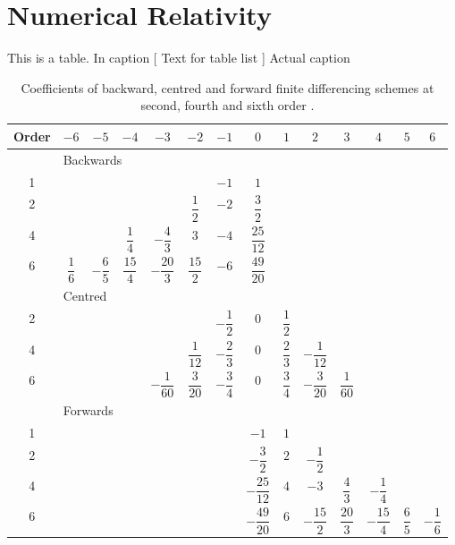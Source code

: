 \chapter{Numerical Relativity} \label{sec: NR}

This is a table. In caption [ Text for table list ] { Actual caption }

\begin{table}[!ht]
\centering
\begin{tabular}{c|ccccccccccccc}
Order & $-6$ & $-5$ & $-4$ & $-3$ & $-2$ & $-1$ & $0$ & $1$ & $2$ & $3$ & $4$ & $5$ & $6$ \\
\hline
      & \multicolumn{3}{l}{Backwards} & & & & & & & & & & \\
\hline
\rule{0pt}{4ex}1     & & & & &  & $- 1$ & $1$ & & & & & & \\[2.25ex]
2     & & & & & $\dfrac{1}{2}$ & $- 2$ & $\dfrac{3}{2}$ & & & & & & \\[2.25ex]
4     & & & $\dfrac{1}{4}$ & $- \dfrac{4}{3}$ & $3$ & $- 4$ & $\dfrac{25}{12}$ & & & & & & \\[2.25ex]
6     & $\dfrac{1}{6}$ & $- \dfrac{6}{5}$ & $\dfrac{15}{4}$ & $- \dfrac{20}{3}$ & $\dfrac{15}{2}$ & $- 6$ & $\dfrac{49}{20}$ & & & & & & \\[2.25ex]
\hline
      & \multicolumn{3}{l}{Centred} & & & & & & & & & & \\
\hline
\rule{0pt}{4ex}2     & & & & & & $- \dfrac{1}{2}$ & $0$ & $\dfrac{1}{2}$ & & & & & \\[2.25ex]
4     & & & & & $\dfrac{1}{12}$ & $- \dfrac{2}{3}$ & $0$ & $\dfrac{2}{3}$ & $- \dfrac{1}{12}$ & & & & \\[2.25ex]
6     & & & & $- \dfrac{1}{60}$ & $\dfrac{3}{20}$ & $- \dfrac{3}{4}$ & $0$ & $\dfrac{3}{4}$ & $- \dfrac{3}{20}$ & $\dfrac{1}{60}$ & & & \\[2.25ex]
\hline
      & \multicolumn{3}{l}{Forwards} & & & & & & & & & & \\
\hline
\rule{0pt}{4ex}1     & & & & & & & $-1$ & $1$ & & & & & \\[2.25ex]
2     & & & & & & & $- \dfrac{3}{2}$ & $2$ & $- \dfrac{1}{2}$ & & & & \\[2.25ex]
4     & & & & & & & $- \dfrac{25}{12}$ & $4$ & $- 3$ & $\dfrac{4}{3}$ & $- \dfrac{1}{4}$ & & \\[2.25ex]
6     & & & & & & & $- \dfrac{49}{20}$ & $6$ & $- \dfrac{15}{2}$ & $\dfrac{20}{3}$ & $- \dfrac{15}{4}$ & $\dfrac{6}{5}$ & $- \dfrac{1}{6}$ \\[2.25ex]
\end{tabular}
\caption[Finite differencing coefficients]{Coefficients of backward, centred and forward finite differencing schemes at second, fourth and sixth order \citep{B.Fornberg_1988}.}
\label{tab: FD coef}
\end{table}